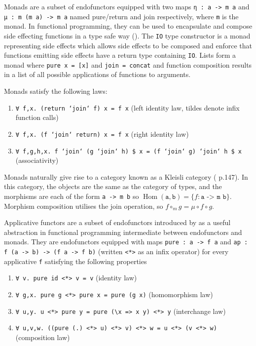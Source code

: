 \documentclass[]{report}
\begin{document}
Monads are a subset of endofunctors equipped with two maps \texttt{η : a -> m a} and \texttt{μ : m (m a) -> m a} named pure/return and join respectively, where \texttt{m} is the monad. In functional programming, they can be used to encapsulate and compose side effecting functions in a type safe way (\cite{moggi1991notions}). The \texttt{IO} type constructor is a monad representing side effects which allows side effects to be composed and enforce that functions emitting side effects have a return type containing \texttt{IO}. Lists form a monad where \texttt{pure x = [x]} and \texttt{join = concat} and function composition results in a list of all possible applications of functions to arguments.

Monads satisfy the following laws:
\begin{enumerate}
	\item \texttt{∀ f,x. (return `join` f) x = f x} (left identity law, tildes denote infix function calls)
	\item \texttt{∀ f,x. (f `join` return) x = f x} (right identity law)
	\item \texttt{∀ f,g,h,x. f `join` (g `join` h) \$ x = (f `join` g) `join` h \$ x} (associativity)
\end{enumerate}

Monads naturally give rise to a category known as a Kleisli category (\cite{mac1970categories} p.147). In this category, the objects are the same as the category of types, and the morphisms are each of the form \texttt{a -> m b} so $\operatorname{Hom}(\texttt{a},\texttt{b})=\{ f : \texttt{a -> m b} \}$. Morphism composition utilises the join operation, so $f\circ_m g = \mu\circ f\circ g$.

Applicative functors are a subset of endofunctors introduced by \cite{mcbride2008applicative} as a useful abstraction in functional programming intermediate between endofunctors and monads. They are endofunctors equipped with maps \texttt{pure : a -> f a} and \texttt{ap : f (a -> b) -> (f a -> f b)} (written \texttt{<*>} as an infix operator) for every applicative \texttt{f} satisfying the following properties

\begin{enumerate}
	\item \texttt{∀ v. pure id <*> v = v} (identity law)
	\item \texttt{∀ g,x. pure g <*> pure x = pure (g x)} (homomorphism law)
	\item \texttt{∀ u,y. u <*> pure y = pure (\textbackslash{}x => x y) <*> y} (interchange law)
	\item \texttt{∀ u,v,w. ((pure (.) <*> u) <*> v) <*> w = u <*> (v <*> w)} (composition law)
\end{enumerate}
\end{document}
